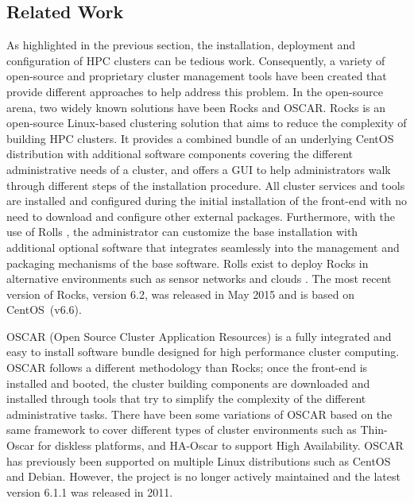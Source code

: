 \subsection{Related Work} \label{sec:related_work}

As highlighted in the previous section, the installation, deployment and
configuration of HPC clusters can be tedious work.  Consequently, a variety of
open-source and proprietary cluster management tools have been created that
provide different approaches to help address this problem.  In the open-source
arena, two widely known solutions have been Rocks and OSCAR.  Rocks
\cite{rocks2003,rocks_url} is an open-source Linux-based clustering solution
that aims to reduce the complexity of building HPC clusters.  It provides a
combined bundle of an underlying CentOS distribution with additional software
components covering the different administrative needs of a cluster, 
and offers a GUI to help administrators walk through
different steps of the installation procedure.  All cluster services and tools
are installed and configured during the initial installation of the front-end
with no need to download and %
configure other external
packages. Furthermore, with the use of Rolls \cite{rolls2004}, the
administrator can customize the base installation
with additional
optional software that integrates seamlessly
into the management and
packaging mechanisms of the base software.
Rolls
exist to deploy Rocks in alternative environments
such as sensor networks \cite{rolls_sensors2012} and clouds \cite{rolls_cloud2011}.
The most recent version of Rocks, version 6.2, was released in May 2015 and is
based on CentOS~(v6.6).

OSCAR \cite{oscar2001,oscar_url} (Open Source Cluster Application Resources) is
a fully integrated and easy to install software bundle designed for high
performance cluster computing.
OSCAR follows a different methodology than Rocks; once
the front-end is installed and booted, the cluster building components are
downloaded and installed through tools that try to simplify the complexity of
the different administrative tasks.  There have been some variations of OSCAR
based on the same framework to cover different types of cluster environments
such as Thin-Oscar for diskless platforms, and HA-Oscar to support High
Availability. OSCAR has previously been supported on multiple Linux distributions such as
CentOS and Debian. However,
the project is no longer actively maintained and the latest
version 6.1.1 was released in 2011.

